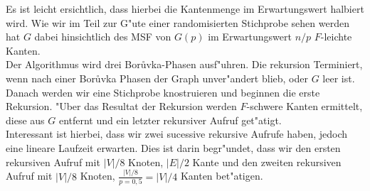 \documentclass[a4paper,12pt,times,german]{cls/summary}
\begin{document}
    Es ist leicht ersichtlich, dass hierbei die Kantenmenge im Erwartungswert
    halbiert wird.
    Wie wir im Teil zur G"ute einer randomisierten Stichprobe sehen werden 
    hat $G$ dabei hinsichtlich des MSF von $G(p)$ im Erwartungswert $n/p$
    $F$-leichte Kanten.\\
Der Algorithmus wird drei Bor\r uvka-Phasen ausf"uhren.
    Die rekursion Terminiert, wenn nach einer Bor\r uvka Phasen der Graph 
    unver"andert blieb, oder $G$ leer ist.
    Danach werden wir eine Stichprobe knostruieren und beginnen die erste
    Rekursion.
    "Uber das Resultat der Rekursion werden $F$-schwere Kanten ermittelt, 
    diese aus $G$ entfernt und ein letzter rekursiver Aufruf get"atigt.\\
Interessant ist hierbei, dass wir zwei sucessive rekursive Aufrufe haben, jedoch
    eine lineare Laufzeit erwarten.
    Dies ist darin begr"undet, dass wir den ersten rekursiven Aufruf mit 
    $|V|/8$ Knoten, $|E|/2$ Kante und den zweiten rekursiven Aufruf mit $|V|/8$ Knoten,
    $\frac{|V|/8}{p=0,5} = |V|/4$ Kanten bet"atigen.
    
\end{document}
